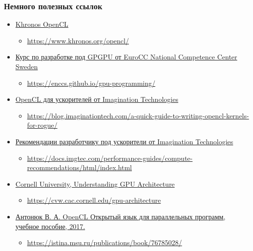 \documentclass[xcolor=table,aspectratio=169]{beamer}
\begin{document}
\begin{frame}[fragile]
  \frametitle{Немного полезных ссылок}
  \begin{itemize}
    \item \href{https://www.khronos.org/opencl/}{Khronos OpenCL}
    \begin{itemize}
      \item \scriptsize{\url{https://www.khronos.org/opencl/}}
    \end{itemize}
    \item \href{https://enccs.github.io/gpu-programming/}{Курс по разработке под GPGPU от EuroCC National Competence Center Sweden}
    \begin{itemize}
      \item \scriptsize{\url{https://enccs.github.io/gpu-programming/}}
    \end{itemize}
    \item \href{https://blog.imaginationtech.com/a-quick-guide-to-writing-opencl-kernels-for-rogue/}{OpenCL для ускорителей от Imagination Technologies}
    \begin{itemize}
      \item \scriptsize{\url{https://blog.imaginationtech.com/a-quick-guide-to-writing-opencl-kernels-for-rogue/}}
    \end{itemize}
    \item \href{https://docs.imgtec.com/performance-guides/compute-recommendations/html/index.html}{Рекомендации разработчику под ускорители от Imagination Technologies}
    \begin{itemize}
      \item \scriptsize{\url{https://docs.imgtec.com/performance-guides/compute-recommendations/html/index.html}}
    \end{itemize}
    \item \href{https://cvw.cac.cornell.edu/gpu-architecture}{Cornell University, Understanding GPU Architecture}
    \begin{itemize}
      \item \scriptsize{\url{https://cvw.cac.cornell.edu/gpu-architecture}}
    \end{itemize}
    \item \href{https://istina.msu.ru/publications/book/76785028/}{Антонюк В. А. OpenCL Открытый язык для параллельных программ, учебное пособие, 2017.}
    \begin{itemize}
      \item \scriptsize{\url{https://istina.msu.ru/publications/book/76785028/}}
    \end{itemize} 
  \end{itemize}
\end{frame}

\end{document}
